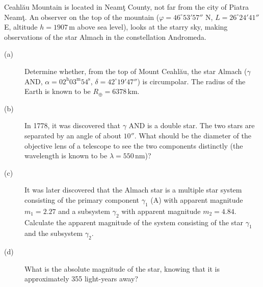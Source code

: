 Ceahl\u{a}u Mountain is located in Neam\c{t} County, not far from the city of Piatra Neam\c{t}. An observer on the top of the mountain ($\varphi=46^\circ53'57''$ N, $L=26^\circ24'41''$ E, altitude $h=1907\,\mathrm m$ above sea level), looks at the starry sky, making observations of the star Almach in the constellation Andromeda.
\begin{description}
\item[(a)] Determine whether, from the top of Mount Ceahl\u{a}u, the star Almach ($\gamma$ AND, $\alpha=02^{\mathrm h}03^{\mathrm m}54^{\mathrm s}$, $\delta=42^\circ19'47''$) is circumpolar. The radius of the Earth is known to be $R_\oplus=6378\,\mathrm{km}$.
\item[(b)] In 1778, it was discovered that $\gamma$ AND is a double star. The two stars are separated by an angle of about $10''$. What should be the diameter of the objective lens of a telescope to see the two components distinctly (the wavelength is known to be $\lambda=550\,\mathrm{nm}$)?
\item[(c)] It was later discovered that the Almach star is a multiple star system consisting of the primary component $\gamma_1$ (A) with apparent magnitude $m_1=2.27$ and a subsystem $\gamma_2$ with apparent magnitude $m_2=4.84$. Calculate the apparent magnitude of the system consisting of the star $\gamma_1$ and the subsystem $\gamma_2$.
\item[(d)] What is the absolute magnitude of the star, knowing that it is approximately 355 light-years away?
\end{description}
